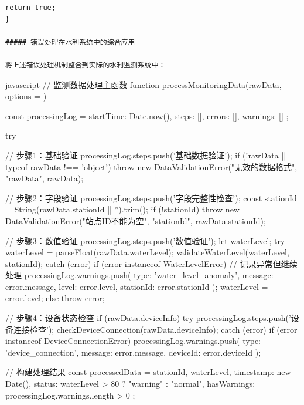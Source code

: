 {\begin{lstlisting}[style=javascript]
    return true;
}

##### 错误处理在水利系统中的综合应用

将上述错误处理机制整合到实际的水利监测系统中：

\end{lstlisting}javascript
// 监测数据处理主函数
function processMonitoringData(rawData, options = {}) {
    const processingLog = {
        startTime: Date.now(),
        steps: [],
        errors: [],
        warnings: []
    };
    
    try {
        // 步骤1：基础验证
        processingLog.steps.push('基础数据验证');
        if (!rawData || typeof rawData !== 'object') {
            throw new DataValidationError("无效的数据格式", "rawData", rawData);
        }
        
        // 步骤2：字段验证
        processingLog.steps.push('字段完整性检查');
        const stationId = String(rawData.stationId || '').trim();
        if (!stationId) {
            throw new DataValidationError("站点ID不能为空", "stationId", rawData.stationId);
        }
        
        // 步骤3：数值验证
        processingLog.steps.push('数值验证');
        let waterLevel;
        try {
            waterLevel = parseFloat(rawData.waterLevel);
            validateWaterLevel(waterLevel, stationId);
        } catch (error) {
            if (error instanceof WaterLevelError) {
                // 记录异常但继续处理
                processingLog.warnings.push({
                    type: 'water_level_anomaly',
                    message: error.message,
                    level: error.level,
                    stationId: error.stationId
                });
                waterLevel = error.level;
            } else {
                throw error;
            }
        }
        
        // 步骤4：设备状态检查
        if (rawData.deviceInfo) {
            try {
                processingLog.steps.push('设备连接检查');
                checkDeviceConnection(rawData.deviceInfo);
            } catch (error) {
                if (error instanceof DeviceConnectionError) {
                    processingLog.warnings.push({
                        type: 'device_connection',
                        message: error.message,
                        deviceId: error.deviceId
                    });
                }
            }
        }
        
        // 构建处理结果
        const processedData = {
            stationId,
            waterLevel,
            timestamp: new Date(),
            status: waterLevel > 80 ? "warning" : "normal",
            hasWarnings: processingLog.warnings.length > 0
        };
        
}}}
